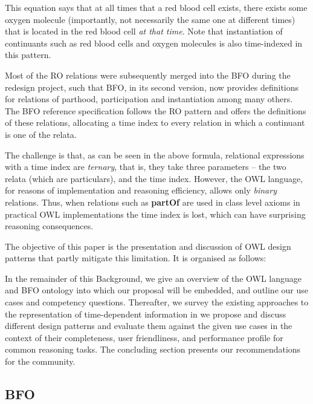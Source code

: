 This equation says that at all times that a red blood cell exists, there exists some oxygen molecule (importantly, not necessarily the same one at different times) that is located in the red blood cell \emph{at that time}. Note that instantiation of continuants such as red blood cells and oxygen molecules is also time-indexed in this pattern. 

Most of the RO relations 
were subsequently merged into the BFO during the redesign project, such that BFO, in its second version, now provides definitions for relations of parthood, participation and instantiation among many others. The BFO reference specification follows the RO pattern and offers the definitions of these relations, allocating a time index to every relation in which a continuant is one of the relata. 

The challenge is that, as can be seen in the above formula, relational expressions with a time index are \emph{ternary}, that is, they take three parameters -- the two relata (which are particulars), and the time index. However, the OWL language, for reasons of implementation and reasoning efficiency, allows only \emph{binary} relations. 
Thus, when relations such as \textbf{partOf} are used in class level axioms
in practical OWL implementations 
the time index is lost, which can have surprising reasoning consequences. 


The objective of this paper is the presentation and discussion of OWL design patterns that partly mitigate this limitation. It is organised as follows:

In the remainder of this Background, we give an overview of the OWL language and BFO ontology into which our proposal will be embedded, and outline our use cases and competency questions.
Thereafter, we survey the existing approaches to the representation of time-dependent information in
we propose and discuss different design patterns and evaluate them against the given use cases in the context of their completeness, user friendliness, and performance profile for common reasoning tasks.
The concluding section presents our recommendations for the community.

\subsection*{BFO}

